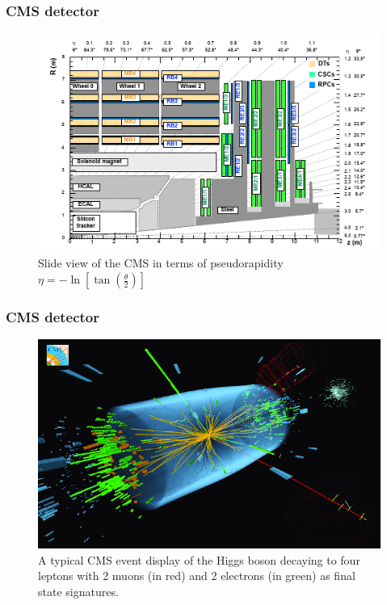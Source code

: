 \documentclass[11pt]{beamer}
\begin{document}
\begin{frame}
\frametitle{CMS detector}
\begin{figure}[ht!]
	\centering
	\includegraphics[scale=0.6]{figures/csc.png}
	\caption*{Slide view of the CMS in terms of pseudorapidity $\eta=-\ln\left[\tan\left(\frac{\theta}{2}\right)\right]$}
\end{figure}
\end{frame}

\begin{frame}
\frametitle{CMS detector}
\begin{figure}
	\centering
	\includegraphics[scale=0.4]{figures/pp.png}
	\caption*{\small A typical CMS event display of the Higgs boson decaying to four leptons with 2 muons (in red) and 2 electrons (in green) as final state signatures.}
\end{figure}
\end{frame}
\end{document}
